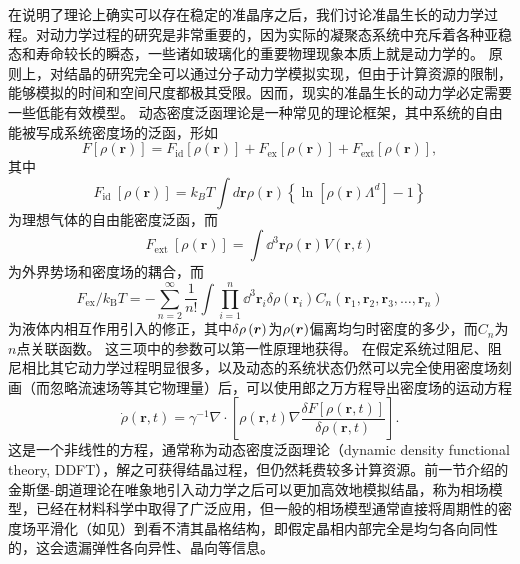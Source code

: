 \documentclass[hyperref, UTF8, a4paper]{ctexart}
\begin{document}
在说明了理论上确实可以存在稳定的准晶序之后，我们讨论准晶生长的动力学过程。对动力学过程的研究是非常重要的，因为实际的凝聚态系统中充斥着各种亚稳态和寿命较长的瞬态\cite{PhysRevB.75.064107}，一些诸如玻璃化的重要物理现象本质上就是动力学的\cite{mct-primer}。
原则上，对结晶的研究完全可以通过分子动力学模拟实现，但由于计算资源的限制，能够模拟的时间和空间尺度都极其受限\cite{PhysRevLett.88.245701}。因而，现实的准晶生长的动力学必定需要一些低能有效模型。
动态密度泛函理论是一种常见的理论框架\cite{pfc2009,PhysRevB.75.064107}，其中系统的自由能被写成系统密度场的泛函，形如
\begin{equation}
    F[\rho(\boldsymbol{r})]=F_{\mathrm{id}}[\rho(\boldsymbol{r})]+F_{\mathrm{ex}}[\rho(\boldsymbol{r})]+F_{\mathrm{ext}}[\rho(\boldsymbol{r})],
\end{equation}
其中
\begin{equation}
    F_{\text {id }}[\rho(\boldsymbol{r})]=k_{B} T \int d \boldsymbol{r} \rho(\boldsymbol{r})\left\{\ln \left[\rho(\boldsymbol{r}) \Lambda^{d}\right]-1\right\}
    \label{eq:id-free-energy}
\end{equation}
为理想气体的自由能密度泛函，而
\begin{equation}
    F_{\text {ext }}[\rho(\boldsymbol{r})]=\int \dd^3 \boldsymbol{r} \rho(\boldsymbol{r}) V(\boldsymbol{r}, t)
\end{equation}
为外界势场和密度场的耦合，而
\begin{equation}
    {F}_\text{ex} / k_\text{B} T=-\sum_{n=2}^{\infty} \frac{1}{n !} \int \prod_{i=1}^{n} \dd^3 \boldsymbol{r}_{i} \delta \rho\left(\boldsymbol{r}_{i}\right) C_{n}\left(\boldsymbol{r}_{1}, \boldsymbol{r}_{2}, \boldsymbol{r}_{3}, \ldots, \boldsymbol{r}_{n} \right)
    \label{eq:ex-free-energy}
\end{equation}
为液体内相互作用引入的修正，其中$\var{\rho}(\vb*{r})$为$\rho(\vb*{r})$偏离均匀时密度的多少，而$C_n$为$n$点关联函数。
这三项中的参数可以第一性原理地获得。
在假定系统过阻尼、阻尼相比其它动力学过程明显很多，以及动态的系统状态仍然可以完全使用密度场刻画（而忽略流速场等其它物理量）后，可以使用郎之万方程导出密度场的运动方程\cite{pfc2009,PhysRevB.75.064107}
\begin{equation}
    \dot{\rho}(\mathbf{r}, t)=\gamma^{-1} \nabla \cdot\left[\rho(\mathbf{r}, t) \nabla \frac{\delta F[\rho(\mathbf{r}, t)]}{\delta \rho(\mathbf{r}, t)}\right].
    \label{eq:ddft}
\end{equation}
这是一个非线性的方程，通常称为动态密度泛函理论（dynamic density functional theory, DDFT），解之可获得结晶过程\cite{Neuhaus_2014}，但仍然耗费较多计算资源。前一节介绍的金斯堡-朗道理论在唯象地引入动力学之后可以更加高效地模拟结晶，称为相场模型，已经在材料科学中取得了广泛应用\cite{provatas2011phase,boettinger2002phase}，但一般的相场模型通常直接将周期性的密度场平滑化（如见）到看不清其晶格结构，即假定晶相内部完全是均匀各向同性的，这会遗漏弹性各向异性、晶向等信息。
\end{document}
